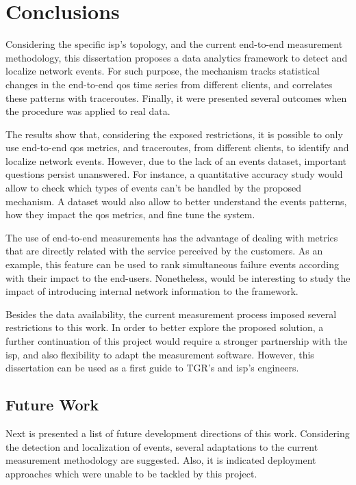 \chapter{Conclusions}
\label{chap:conclusion}

Considering the specific \gls*{isp}'s topology, and the current end-to-end measurement
methodology, this dissertation proposes a data analytics framework to
detect and localize network events.
For such purpose, the mechanism tracks
statistical changes in the end-to-end \gls*{qos} time series from different clients,
and correlates these patterns with traceroutes.
Finally, it were presented several outcomes when the procedure was applied to
real data.

The results show that, considering the exposed restrictions,
it is possible to only use end-to-end \gls*{qos} metrics, and traceroutes, from
different clients, to identify and localize network events.
However, due to the lack of an events dataset, important
questions persist unanswered.
For instance, a quantitative accuracy study
would allow to check which types of events can't be handled by the
proposed mechanism.
A dataset would also allow to better understand the events
patterns, how they impact the \gls*{qos} metrics, and fine tune the system.

The use of end-to-end measurements has the advantage of dealing with
metrics that are directly related with the service perceived by the customers.
As an example, this feature can be used to rank simultaneous failure events
according with their impact to the end-users.
Nonetheless, would be interesting to study the impact of introducing
internal network information to the framework.

Besides the data availability, the current measurement process imposed
several restrictions to this work.
In order to better explore the proposed solution,
a further continuation of this project
would require a stronger partnership with the \gls*{isp},
and also flexibility to adapt the measurement software.
However, this dissertation can be used as a first guide to TGR's and \gls*{isp}'s engineers.

\section{Future Work}

Next is presented a list of future development directions of this work.
Considering the detection and localization of events, several adaptations to
the current measurement methodology are suggested.
Also, it is indicated deployment approaches which
were unable to be tackled by this project.

